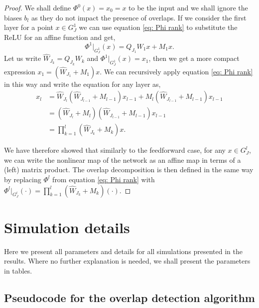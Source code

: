 \documentclass[10pt]{article} %
\theoremstyle{plain}
\theoremstyle{definition}
\theoremstyle{remark}
\begin{document}
\begin{proof}
    {
    We shall define $\Phi^0(x)=x_0=x$ to be the input and we shall ignore the biases $b_l$ as they do not impact the presence of overlaps. If we consider the first layer for a point $x \in G^1_J$ we can use equation \ref{eq: Phi rank} to substitute the ReLU for an affine function and get,
    \begin{equation*}
        \Phi^1|_{G^1_J}(x) = Q_{J_1}W_1x+M_1x.
    \end{equation*}
    Let us write $\hat{W}_{J_k} = Q_{J_k}W_k$ and $\Phi^1|_{G^1_J}(x) = x_1$, then we get a more compact expression $x_1 = (\hat{W}_{J_1}+M_1)x$. We can recursively apply equation \ref{eq: Phi rank} in this way and write the equation for any layer as,}
    {
    \begin{align*}
        x_l &= \hat{W}_{J_l}(\hat{W}_{J_{l-1}}+M_{l-1})x_{l-1}+M_l(\hat{W}_{J_{l-1}}+M_{l-1})x_{l-1} \\
        &= (\hat{W}_{J_l}+M_l)(\hat{W}_{J_{l-1}}+M_{l-1})x_{l-1}\\
        &= \prod_{k=1}^l (\hat{W}_{J_k}+M_k)x.
    \end{align*}
    }

    {
    We have therefore showed that similarly to the feedforward case, for any $x\in G^l_J$, we can write the nonlinear map of the network as an affine map in terms of a (left) matrix product. The overlap decomposition is then defined in the same way by replacing $\Phi^l$ from equation \ref{eq: Phi rank} with $\Phi^l|_{G_J^l}(\cdot) = \prod_{k=1}^l (\hat{W}_{J_k}+M_k)(\cdot)$.}
\end{proof}

\newpage

\section{Simulation details}
\label{Sim details}


Here we present all parameters and details for all simulations presented in the results. Where no further explanation is needed, we shall present the parameters in tables.

\subsection{Pseudocode for the overlap detection algorithm}
\end{document}

